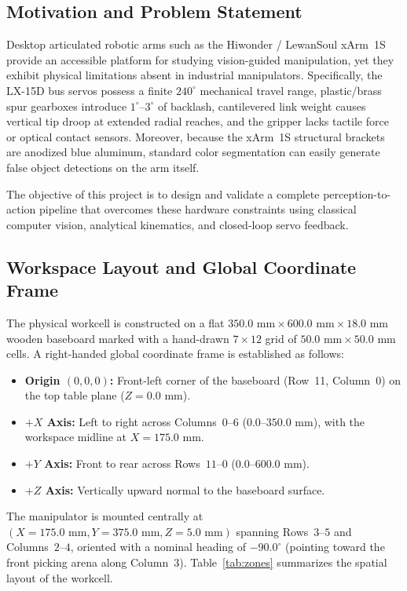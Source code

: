 \documentclass[11pt,a4paper]{article}
\begin{document}
\subsection{Motivation and Problem Statement}
Desktop articulated robotic arms such as the Hiwonder / LewanSoul xArm~1S provide an accessible platform for studying vision-guided manipulation, yet they exhibit physical limitations absent in industrial manipulators. Specifically, the LX-15D bus servos possess a finite $240^\circ$ mechanical travel range, plastic/brass spur gearboxes introduce $1^\circ\text{--}3^\circ$ of backlash, cantilevered link weight causes vertical tip droop at extended radial reaches, and the gripper lacks tactile force or optical contact sensors. Moreover, because the xArm~1S structural brackets are anodized blue aluminum, standard color segmentation can easily generate false object detections on the arm itself.

The objective of this project is to design and validate a complete perception-to-action pipeline that overcomes these hardware constraints using classical computer vision, analytical kinematics, and closed-loop servo feedback.

\subsection{Workspace Layout and Global Coordinate Frame}
The physical workcell is constructed on a flat $350.0\text{ mm} \times 600.0\text{ mm} \times 18.0\text{ mm}$ wooden baseboard marked with a hand-drawn $7 \times 12$ grid of $50.0\text{ mm} \times 50.0\text{ mm}$ cells. A right-handed global coordinate frame is established as follows:
\begin{itemize}[noitemsep]
  \item \textbf{Origin $(0, 0, 0)$:} Front-left corner of the baseboard (Row~11, Column~0) on the top table plane ($Z = 0.0\text{ mm}$).
  \item \textbf{$+X$ Axis:} Left to right across Columns~$0\text{--}6$ ($0.0\text{--}350.0\text{ mm}$), with the workspace midline at $X = 175.0\text{ mm}$.
  \item \textbf{$+Y$ Axis:} Front to rear across Rows~$11\text{--}0$ ($0.0\text{--}600.0\text{ mm}$).
  \item \textbf{$+Z$ Axis:} Vertically upward normal to the baseboard surface.
\end{itemize}

The manipulator is mounted centrally at $(X = 175.0\text{ mm}, Y = 375.0\text{ mm}, Z = 5.0\text{ mm})$ spanning Rows~$3\text{--}5$ and Columns~$2\text{--}4$, oriented with a nominal heading of $-90.0^\circ$ (pointing toward the front picking arena along Column~3). Table~\ref{tab:zones} summarizes the spatial layout of the workcell.
\end{document}
